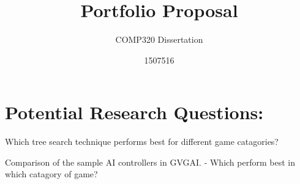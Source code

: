 \documentclass{scrartcl}
\title{Portfolio Proposal}
\subtitle{COMP320 Dissertation}
\author{1507516}
\begin{document}
\maketitle

\abstract{}


\section{Potential Research Questions:}

Which tree search technique performs best for different game catagories?

Comparison of the sample AI controllers in GVGAI. - Which perform best in which catagory of game?
\end{document}
